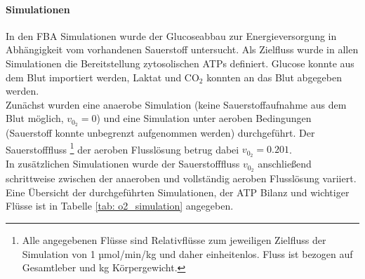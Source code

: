 \paragraph{Simulationen}
In den FBA Simulationen wurde der Glucoseabbau zur Energieversorgung in Abhängigkeit vom vorhandenen Sauerstoff untersucht. Als Zielfluss wurde in allen Simulationen die Bereitstellung zytosolischen ATPs definiert.
Glucose konnte aus dem Blut importiert werden, Laktat und $\text{CO}_2$ konnten an das Blut abgegeben werden.\\
Zunächst wurden eine anaerobe Simulation (keine Sauerstoffaufnahme aus dem Blut möglich, $v_{0_2}=0$) und eine Simulation unter aeroben Bedingungen (Sauerstoff konnte unbegrenzt aufgenommen werden) durchgeführt. Der Sauerstofffluss \footnote{Alle angegebenen Flüsse sind Relativflüsse zum jeweiligen Zielfluss der Simulation von 1 µmol/min/kg und daher einheitenlos. Fluss ist bezogen auf Gesamtleber und kg Körpergewicht.} der aeroben Flusslösung betrug dabei $v_{0_2}=0.201$.\\
In zusätzlichen Simulationen wurde der Sauerstofffluss $v_{0_2}$ anschließend schrittweise zwischen der anaeroben und vollständig aeroben Flusslösung variiert.\\
Eine Übersicht der durchgeführten Simulationen, der ATP Bilanz und wichtiger Flüsse ist in Tabelle \ref{tab: o2_simulation} angegeben. 

